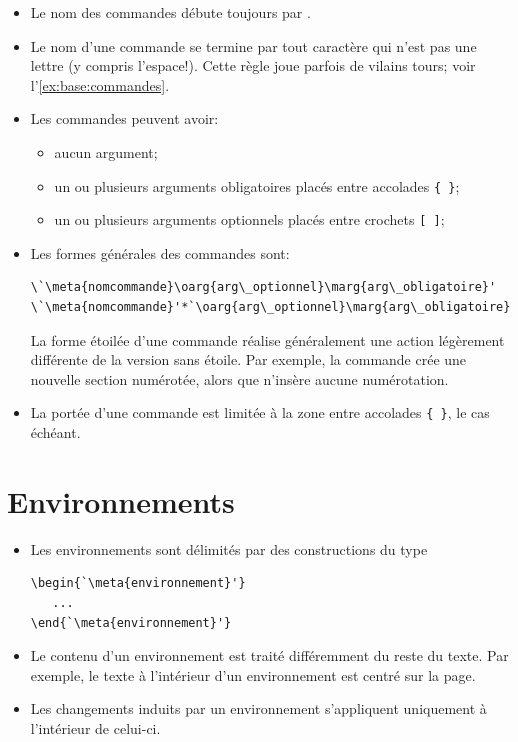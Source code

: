 \begin{itemize}
\item Le nom des commandes débute toujours par {\bs}.
\item Le nom d'une commande se termine par tout caractère qui n'est
  pas une lettre (y compris l'espace!). Cette règle joue parfois de
  vilains tours; voir l'\autoref{ex:base:commandes}.
\item Les commandes peuvent avoir:
  \begin{itemize}
  \item aucun argument;
  \item un ou plusieurs arguments obligatoires placés entre accolades
    \verb={ }=;
  \item un ou plusieurs arguments optionnels placés entre crochets
    \verb=[ ]=;
  \end{itemize}
\item Les formes générales des commandes sont:
\begin{lstlisting}
\`\meta{nomcommande}\oarg{arg\_optionnel}\marg{arg\_obligatoire}'
\`\meta{nomcommande}'*`\oarg{arg\_optionnel}\marg{arg\_obligatoire}'
\end{lstlisting}
  La forme étoilée d'une commande réalise généralement une action
  légèrement différente de la version sans étoile. Par exemple, la
  commande \cmd{\section} crée une nouvelle section numérotée, alors
  que \cmd{\section*} n'insère aucune numérotation.
\item La portée d'une commande est limitée à la zone entre accolades
  \verb={ }=, le cas échéant.
\end{itemize}


\section{Environnements}

\begin{itemize}
\item Les environnements sont délimités par des constructions du type
\begin{lstlisting}
\begin{`\meta{environnement}'}
   ...
\end{`\meta{environnement}'}
\end{lstlisting}
\item Le contenu d'un environnement est traité différemment du reste
  du texte. Par exemple, le texte à l'intérieur d'un environnement
   est centré sur la page.
\item Les changements induits par un environnement s'appliquent
  uniquement à l'intérieur de celui-ci.
\end{itemize}


